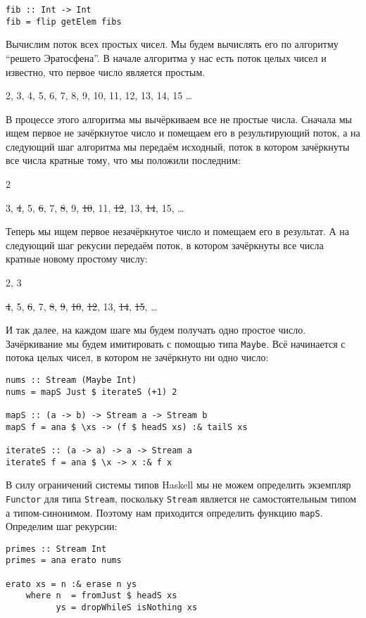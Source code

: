 \begin{verbatim}
fib :: Int -> Int
fib = flip getElem fibs
\end{verbatim}

Вычислим поток всех простых чисел. Мы будем вычислять его по алгоритму
``решето Эратосфена''. В начале алгоритма у нас есть поток целых чисел и
известно, что первое число является простым.

2, 3, 4, 5, 6, 7, 8, 9, 10, 11, 12, 13, 14, 15 \ldots{}

В процессе этого алгоритма мы вычёркиваем все не простые числа. Сначала
мы ищем первое не зачёркнутое число и помещаем его в результирующий
поток, а на следующий шаг алгоритма мы передаём исходный, поток в
котором зачёркнуты все числа кратные тому, что мы положили последним:

2

3, \sout{4}, 5, \sout{6}, 7, \sout{8}, 9, \sout{10}, 11, \sout{12}, 13,
\sout{14}, 15, \ldots{}

Теперь мы ищем первое незачёркнутое число и помещаем его в результат. А
на следующий шаг рекусии передаём поток, в котором зачёркнуты все числа
кратные новому простому числу:

2, 3

\sout{4}, 5, \sout{6}, 7, \sout{8}, \sout{9}, \sout{10}, \sout{12}, 13,
\sout{14}, \sout{15}, \ldots{}

И так далее, на каждом шаге мы будем получать одно простое число.
Зачёркивание мы будем имитировать с помощью типа \texttt{Maybe}. Всё
начинается с потока целых чисел, в котором не зачёркнуто ни одно число:

\begin{verbatim}
nums :: Stream (Maybe Int)
nums = mapS Just $ iterateS (+1) 2 

mapS :: (a -> b) -> Stream a -> Stream b
mapS f = ana $ \xs -> (f $ headS xs) :& tailS xs

iterateS :: (a -> a) -> a -> Stream a
iterateS f = ana $ \x -> x :& f x
\end{verbatim}

В силу ограничений системы типов Haskell мы не можем определить
экземпляр \texttt{Functor} для типа \texttt{Stream}, поскольку
\texttt{Stream} является не самостоятельным типом а типом-синонимом.
Поэтому нам приходится определить функцию \texttt{mapS}. Определим шаг
рекурсии:

\begin{verbatim}
primes :: Stream Int
primes = ana erato nums

erato xs = n :& erase n ys
    where n  = fromJust $ headS xs  
          ys = dropWhileS isNothing xs
\end{verbatim}

